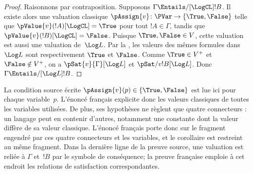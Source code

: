 \documentclass[../../../include/open-logic-section]{subfiles}
\begin{document}
\begin{proof}
Raisonnons par contraposition.
Supposons
$\Gamma\Entails/[\LogCL] !B$.
Il existe alors une valuation
classique
$\pAssign{v}\colon\PVar\to
\{\True,\False\}$ telle que
$\pValue{v}(!A)[\LogCL]=\True$
pour tout $!A\in\Gamma$, tandis que
$\pValue{v}(!B)[\LogCL]=\False$.
Puisque $\True,\False\in V$, cette
valuation est aussi une valuation
de~$\Log L$. Par la
, les valeurs
des mêmes formules dans~$\Log L$
sont respectivement $\True$ et
$\False$. Comme $\True\in V^+$
et $\False\notin V^+$, on a
$\pSat{v}{\Gamma}[\Log L]$ et
$\pSat/{v}{!B}[\Log L]$.
Donc $\Gamma\Entails/[\Log L] !B$.
\end{proof}

\begin{editorial}
La condition source écrite
$\pAssign{v}(p)\in\{\True,\False\}$
est lue ici pour chaque variable~$p$.
L'énoncé français explicite donc
les valeurs classiques de toutes
les variables utilisées. De plus,
ses hypothèses ne règlent que quatre
connecteurs : un langage peut en
contenir d'autres, notamment une
constante dont la valeur diffère
de sa valeur classique. L'énoncé
français porte donc sur le fragment
engendré par ces quatre connecteurs
et les variables, et le corollaire
est restreint au même fragment.
Dans la dernière ligne de la preuve
source, une valuation est reliée à
$\Gamma$ et~$!B$ par le symbole de
conséquence; la preuve française
emploie à cet endroit les relations
de satisfaction correspondantes.
\end{editorial}
\end{document}

